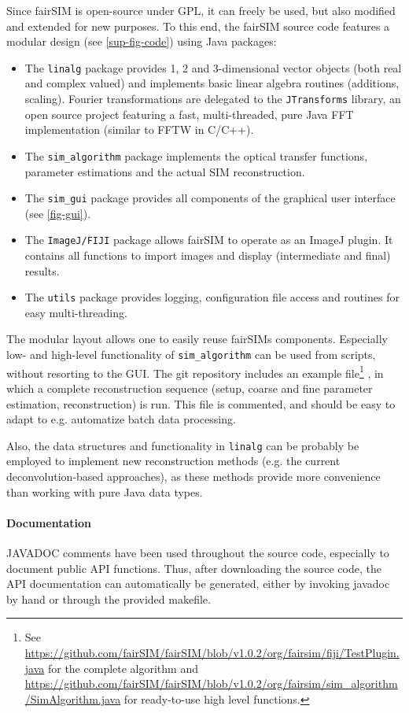\documentclass[twoside=false,
           twocolumn=false,
           a4paper,DIV=15,
           10pt]{scrartcl}
\begin{document}
Since fairSIM is open-source under GPL, it can freely be used,
but also modified and extended for new purposes. To this end,
the fairSIM source code features a modular design (see \cref{sup-fig-code})
using Java packages:

\begin{itemize}
\item  The \verb+linalg+ package provides 1, 2 and 3-dimensional
vector objects (both real and complex valued) and implements basic
linear algebra routines (additions, scaling). Fourier transformations
are delegated to the \verb+JTransforms+ library, an open source
project featuring a fast, multi-threaded, pure Java 
FFT implementation (similar to FFTW in C/C++).
\item The \verb+sim_algorithm+ package implements the optical transfer
functions, parameter estimations and the actual SIM reconstruction.
\item The \verb+sim_gui+ package provides all components of the graphical 
user interface (see \cref{fig-gui}).
\item The \verb+ImageJ/FIJI+ package allows fairSIM to operate as an
ImageJ plugin. It contains all functions to import images and display
(intermediate and final) results.
\item The \verb+utils+ package provides logging, configuration
file access and routines for easy multi-threading.
\end{itemize}

The modular layout allows one to easily reuse fairSIMs components.
Especially low- and high-level functionality of \verb+sim_algorithm+ can be
used from scripts, without resorting to the GUI. The git repository includes
an example file\footnote{
See \url{https://github.com/fairSIM/fairSIM/blob/v1.0.2/org/fairsim/fiji/TestPlugin.java}
for the complete algorithm and 
\url{https://github.com/fairSIM/fairSIM/blob/v1.0.2/org/fairsim/sim_algorithm/SimAlgorithm.java}
for ready-to-use high level functions.}
, in which a complete reconstruction sequence (setup, coarse and fine
parameter estimation, reconstruction) is run. This file is commented, and
should be easy to adapt to e.g. automatize batch data processing.

Also, the data structures and functionality in \verb+linalg+ can be 
probably be employed to implement new reconstruction methods (e.g. the
current deconvolution-based approaches), as these methods provide more 
convenience than working with pure Java data types.

\paragraph{Documentation}
JAVADOC comments have been used throughout the source code, especially to document
public API functions. Thus, after downloading the source code, the API documentation
can automatically be generated, either by invoking javadoc by hand or through
the provided makefile.
\end{document}
